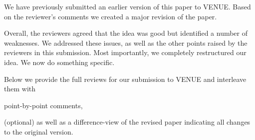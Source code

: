 
We have previously submitted an earlier version of this paper to VENUE. 
Based on the reviewer's comments we created a major revision of the paper. 

Overall, the reviewers agreed that the idea was good but identified a number of weaknesses.
We addressed these issues, as well as the other points raised by the reviewers in this submission. 
Most importantly, we completely restructured our idea.
We now do something specific.

Below we provide the full reviews for our submission to VENUE and interleave them with
\begin{xresponse}
point-by-point comments,
\end{xresponse}
(optional) as well as a difference-view of the revised paper indicating all changes to the original version.